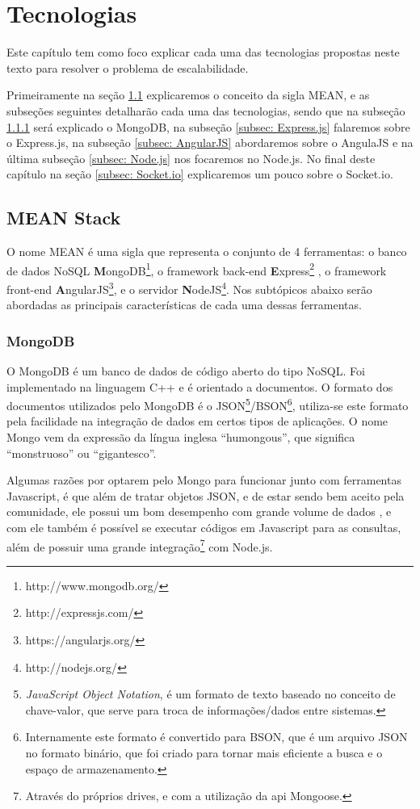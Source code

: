 \chapter{Tecnologias}
\label{tecnologias}
Este capítulo tem como foco explicar cada uma das tecnologias propostas neste texto para resolver o problema de escalabilidade. 

Primeiramente na seção \ref{sec: MEAN} explicaremos o conceito da sigla MEAN, e as subseções seguintes detalharão cada uma das tecnologias, sendo que na subseção \ref{subsec: MongoDB} será explicado o MongoDB, na subseção \ref{subsec: Express.js} falaremos sobre o Express.js, na subseção \ref{subsec: AngularJS} abordaremos sobre o AngulaJS e na última subseção \ref{subsec: Node.js} nos focaremos no Node.js. No final deste capítulo na seção \ref{subsec: Socket.io} explicaremos um pouco sobre o Socket.io.

\section{MEAN Stack}
\label{sec: MEAN}
O nome MEAN é uma sigla que representa o conjunto de 4 ferramentas:
o banco de dados NoSQL \textbf{M}ongoDB\footnote{http://www.mongodb.org/}, o framework back-end \textbf{E}xpress\footnote{http://expressjs.com/} , o framework front-end \textbf{A}ngularJS\footnote{https://angularjs.org/}, e o servidor \textbf{N}odeJS\footnote{http://nodejs.org/}. Nos subtópicos abaixo serão abordadas as principais características de cada uma dessas ferramentas.

\subsection{MongoDB}
\label{subsec: MongoDB}
O MongoDB é um banco de dados de código aberto do tipo NoSQL. Foi implementado na linguagem  C++ e é orientado a documentos. O formato dos documentos utilizados pelo MongoDB é o JSON\footnote{\textit{JavaScript Object Notation}, é um formato de texto baseado no conceito de chave-valor, que serve para troca de informações/dados entre sistemas.}/BSON\footnote{Internamente este formato é convertido para BSON, que é um arquivo JSON no formato binário, que foi criado para tornar mais eficiente a busca e o espaço de armazenamento.}, utiliza-se este formato pela facilidade na integração de dados em certos tipos de aplicações. O nome Mongo vem da expressão da língua inglesa ``humongous'',  que significa ``monstruoso'' ou ``gigantesco''. 

Algumas razões por optarem pelo Mongo para funcionar junto com ferramentas Javascript, é que além de tratar objetos JSON, e de estar sendo bem aceito pela comunidade\cite{dbEng}, ele possui um bom desempenho com grande volume de dados \cite{compBds}, e com ele também é possível se executar códigos em Javascript  para as consultas, além de possuir uma grande integração\footnote{Através do próprios drives, e com a utilização da api Mongoose.} com Node.js.   


